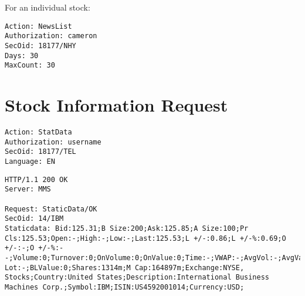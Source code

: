 \documentclass[12pt,twoside,letterpaper]{report}
\begin{document}
For an individual stock:

\begin{verbatim}
Action: NewsList
Authorization: cameron
SecOid: 18177/NHY
Days: 30
MaxCount: 30
\end{verbatim}

\section*{Stock Information Request}
\begin{verbatim}
Action: StatData
Authorization: username
SecOid: 18177/TEL
Language: EN
\end{verbatim}

\begin{verbatim}
HTTP/1.1 200 OK
Server: MMS

Request: StaticData/OK
SecOid: 14/IBM
Staticdata: Bid:125.31;B Size:200;Ask:125.85;A Size:100;Pr Cls:125.53;Open:-;High:-;Low:-;Last:125.53;L +/-:0.86;L +/-%:0.69;O +/-:-;O +/-%:--;Volume:0;Turnover:0;OnVolume:0;OnValue:0;Time:-;VWAP:-;AvgVol:-;AvgVal:-;Status:;B Lot:-;BLValue:0;Shares:1314m;M Cap:164897m;Exchange:NYSE, Stocks;Country:United States;Description:International Business Machines Corp.;Symbol:IBM;ISIN:US4592001014;Currency:USD;
\end{verbatim}
\end{document}

